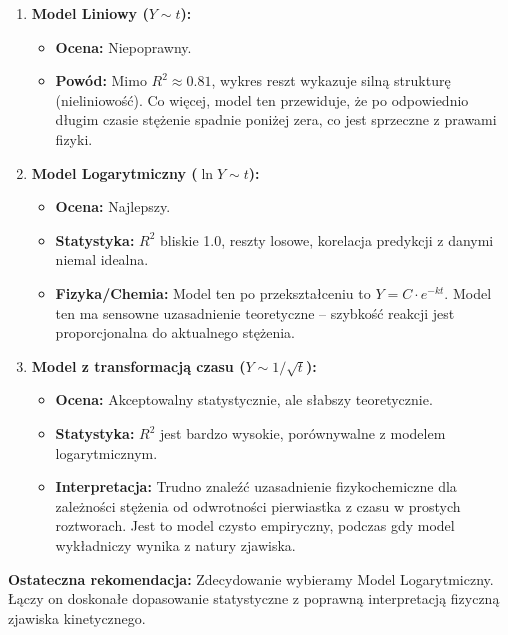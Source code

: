 \documentclass[12pt, a4paper]{article}
\begin{document}
\begin{enumerate}
    \item \textbf{Model Liniowy ($Y \sim t$):}
    \begin{itemize}
        \item \textbf{Ocena:} Niepoprawny.
        \item \textbf{Powód:} Mimo $R^2 \approx 0.81$, wykres reszt wykazuje silną strukturę (nieliniowość). Co więcej, model ten przewiduje, że po odpowiednio długim czasie stężenie spadnie poniżej zera, co jest sprzeczne z prawami fizyki.
    \end{itemize}

    \item \textbf{Model Logarytmiczny ($\ln Y \sim t$):}
    \begin{itemize}
        \item \textbf{Ocena:} Najlepszy.
        \item \textbf{Statystyka:} $R^2$ bliskie 1.0, reszty losowe, korelacja predykcji z danymi niemal idealna.
        \item \textbf{Fizyka/Chemia:} Model ten po przekształceniu to $Y = C \cdot e^{-kt}$. Model ten ma sensowne uzasadnienie teoretyczne – szybkość reakcji jest proporcjonalna do aktualnego stężenia.
    \end{itemize}

    \item \textbf{Model z transformacją czasu ($Y \sim 1/\sqrt{t}$):}
    \begin{itemize}
        \item \textbf{Ocena:} Akceptowalny statystycznie, ale słabszy teoretycznie.
        \item \textbf{Statystyka:} $R^2$ jest bardzo wysokie, porównywalne z modelem logarytmicznym.
        \item \textbf{Interpretacja:} Trudno znaleźć uzasadnienie fizykochemiczne dla zależności stężenia od odwrotności pierwiastka z czasu w prostych roztworach. Jest to model czysto empiryczny, podczas gdy model wykładniczy wynika z natury zjawiska.
    \end{itemize}
\end{enumerate}

\textbf{Ostateczna rekomendacja:}
Zdecydowanie wybieramy Model Logarytmiczny. Łączy on doskonałe dopasowanie statystyczne z poprawną interpretacją fizyczną zjawiska kinetycznego.

\FloatBarrier
\end{document}
